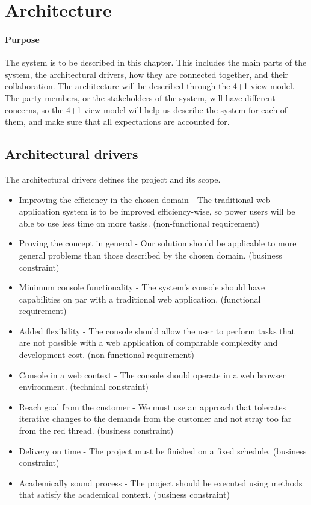 \chapter{Architecture}

\minitoc

\subsubsection{Purpose}

The system is to be described in this chapter. This includes the main parts of the system, the architectural drivers, how they are connected together, and their collaboration. The architecture will be described through the 4+1 view model. The party members, or the stakeholders of the system, will have different concerns, so the 4+1 view model will help us describe the system for each of them, and make sure that all expectations are accounted for.  

\clearpage


\section{Architectural drivers}
The architectural drivers defines the project and its scope. 

\begin{itemize}
    \item Improving the efficiency in the chosen domain - The traditional web application system is to be improved efficiency-wise, so power users will be able to use less time on more tasks. (non-functional requirement)
    \item Proving the concept in general - Our solution should be applicable to more general problems than those described by the chosen domain. (business constraint)
    \item Minimum console functionality - The system's console should have capabilities on par with a traditional web application. (functional requirement)
    \item Added flexibility - The console should allow the user to perform tasks that are not possible with a web application of comparable complexity and development cost. (non-functional requirement)
    \item Console in a web context - The console should operate in a web browser environment. (technical constraint)
    \item Reach goal from the customer - We must use an approach that tolerates iterative changes to the demands from the customer and not stray too far from the red thread. (business constraint)
    \item Delivery on time - The project must be finished on a fixed schedule. (business constraint) 
    \item Academically sound process - The project should be executed using methods that satisfy the academical context. (business constraint)
\end{itemize}


